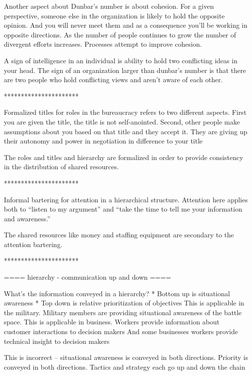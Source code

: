 Another aspect about Dunbar's number is about cohesion. For a given perspective, someone else in the organization is likely to hold the opposite opinion. And you will never meet them and as a consequence you'll be working in opposite directions. As the number of people continues to grow the number of divergent efforts increases. Processes attempt to improve cohesion.

A sign of intelligence in an individual is ability to hold two conflicting ideas in your head. The sign of an organization larger than dunbar's number is that there are two people who hold conflicting views and aren't aware of each other.

**********************



Formalized titles for roles in the bureaucracy refers to two different aspects.
First you are given the title, the title is not self-anointed.
Second, other people make assumptions about you based on that title and they accept it. They are giving up their autonomy and power in negotiation in difference to your title


The roles and titles and hierarchy are formalized in order to provide consistency in the distribution of shared resources.

**********************

Informal bartering for attention in a hierarchical structure. Attention here applies both to ``listen to my argument'' and ``take the time to tell me your information and awareness.''

The shared resources like money and staffing equipment are secondary to the attention bartering.

**********************


==== hierarchy - communication up and down ====

What's the information conveyed in a hierarchy?
* Bottom up is situational awareness
* Top down is relative prioritization of objectives
This is applicable in the military. Military members are providing situational awareness of the battle space.
This is applicable in business. Workers provide information about customer interactions to decision makers
And some businesses workers provide technical insight to decision makers

This is incorrect -- situational awareness is conveyed in both directions. Priority is conveyed in both directions. Tactics and strategy each go up and down the chain

